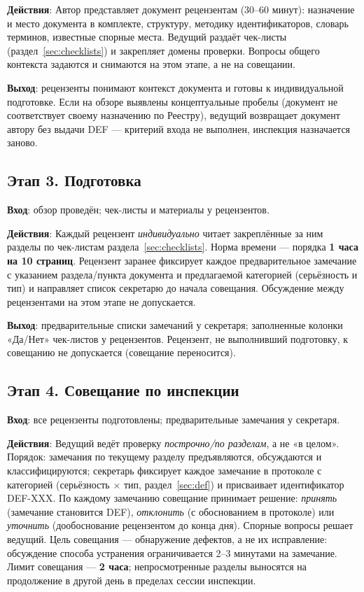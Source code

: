 \documentclass[12pt,a4paper]{article}
\newcommand{\reqfield}[1]{\textbf{#1}:} %
\begin{document}
\reqfield{Действия} Автор представляет документ рецензентам (30--60 минут):
назначение и место документа в комплекте, структуру, методику идентификаторов,
словарь терминов, известные спорные места. Ведущий раздаёт чек-листы
(раздел~\ref{sec:checklists}) и закрепляет домены проверки. Вопросы общего
контекста задаются и снимаются на этом этапе, а не на совещании.

\reqfield{Выход} рецензенты понимают контекст документа и готовы к
индивидуальной подготовке. Если на обзоре выявлены концептуальные пробелы
(документ не соответствует своему назначению по Реестру), ведущий возвращает
документ автору без выдачи DEF --- критерий входа не выполнен, инспекция
назначается заново.

\subsection{Этап 3. Подготовка}

\reqfield{Вход} обзор проведён; чек-листы и материалы у рецензентов.

\reqfield{Действия} Каждый рецензент \emph{индивидуально} читает закреплённые
за ним разделы по чек-листам раздела~\ref{sec:checklists}. Норма времени ---
порядка \textbf{1 часа на 10 страниц}. Рецензент заранее фиксирует каждое
предварительное замечание с указанием раздела/пункта документа и предлагаемой
категорией (серьёзность и тип) и направляет список секретарю до начала
совещания. Обсуждение между рецензентами на этом этапе не допускается.

\reqfield{Выход} предварительные списки замечаний у секретаря; заполненные
колонки «Да/Нет» чек-листов у рецензентов. Рецензент, не выполнивший
подготовку, к совещанию не допускается (совещание переносится).

\subsection{Этап 4. Совещание по инспекции}

\reqfield{Вход} все рецензенты подготовлены; предварительные замечания у
секретаря.

\reqfield{Действия} Ведущий ведёт проверку \emph{построчно/по разделам}, а не
«в целом». Порядок: замечания по текущему разделу предъявляются, обсуждаются и
классифицируются; секретарь фиксирует каждое замечание в протоколе с категорией
(серьёзность $\times$ тип, раздел~\ref{sec:def}) и присваивает идентификатор
DEF-XXX. По каждому замечанию совещание принимает решение:
\emph{принять} (замечание становится DEF), \emph{отклонить} (с обоснованием в
протоколе) или \emph{уточнить} (дообоснование рецензентом до конца дня).
Спорные вопросы решает ведущий. Цель совещания --- обнаружение дефектов, а не
их исправление: обсуждение способа устранения ограничивается 2--3 минутами на
замечание. Лимит совещания --- \textbf{2 часа}; непросмотренные разделы
выносятся на продолжение в другой день в пределах сессии инспекции.
\end{document}
